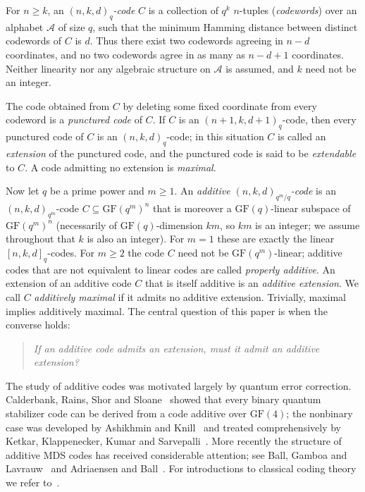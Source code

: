 \documentclass[12pt]{article}
\theoremstyle{definition}
\numberwithin{equation}{section}
\newcommand{\A}{\mathcal{A}}
\newcommand{\GF}[1]{\mathrm{GF}(#1)}
\begin{document}
For $n\geq k$, an \textit{$(n,k,d)_q$-code} $C$ is a collection of $q^k$ $n$-tuples (\textit{codewords}) over an alphabet $\A$ of size $q$, such that the minimum Hamming distance between distinct codewords of $C$ is $d$.  Thus there exist two codewords agreeing in $n-d$ coordinates, and no
two codewords agree in as many as $n-d+1$ coordinates.  
Neither linearity nor any algebraic structure on $\A$ is assumed, and $k$ need not be an integer. 

The code obtained from $C$ by deleting some fixed coordinate from every codeword is a \textit{punctured code} of $C$.  If $C$ is an $(n+1,k,d+1)_q$-code, then every punctured code of $C$ is an $(n,k,d)_q$-code; in this situation $C$ is called an \textit{extension} of the punctured code, and the punctured code is said to be \textit{extendable} to $C$.  A code admitting no extension is
\textit{maximal}.

Now let $q$ be a prime power and $m\geq 1$.  An \textit{additive $(n,k,d)_{q^m/q}$-code} is an $(n,k,d)_{q^m}$-code $C\subseteq\GF{q^m}^n$ that is moreover a $\GF{q}$-linear subspace of $\GF{q^m}^n$ (necessarily of $\GF{q}$-dimension $km$, so $km$ is an integer; we assume throughout that $k$ is also an integer). %
For $m=1$ these are exactly the linear $[n,k,d]_q$-codes.  For $m\geq 2$ the code $C$ need
not be $\GF{q^m}$-linear; additive codes that are not equivalent to linear codes are called \textit{properly additive}.  An extension of an additive code $C$ that is itself additive is an \textit{additive extension}.  We call $C$ \textit{additively maximal} if it admits no additive extension. Trivially, maximal implies additively maximal. The central question of this
paper is when the converse holds:

\begin{quote}
\textit{If an additive code admits an extension, must it admit an additive extension?}
\end{quote}

The study of additive codes was motivated largely by quantum error correction.  Calderbank, Rains, Shor and Sloane~\cite{CRSS98} showed that every binary quantum stabilizer code can be derived from a code additive over $\GF{4}$; the nonbinary case was developed by Ashikhmin and
Knill~\cite{AK01} and treated comprehensively by Ketkar, Klappenecker, Kumar and Sarvepalli~\cite{KKKS06}.  More recently the structure of additive MDS codes has received considerable attention; see Ball, Gamboa and Lavrauw~\cite{BGL22} and Adriaensen and Ball~\cite{AdBall}.  For
introductions to classical coding theory we refer to~\cite{MR0465510,MR1664228,MR2079734,1137784,MR2131191}.
\end{document}
